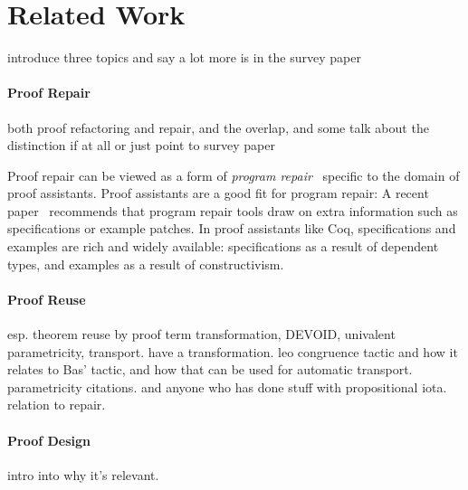 \section{Related Work}


introduce three topics and say a lot more is in the survey paper~\cite{PGL-045}

\paragraph{Proof Repair}

both proof refactoring and repair, and the overlap, and some talk about the distinction if at all or just point to survey paper~\cite{wibergh2019, WhitesidePhD, Dietrich2013, adams2015, Bourke12, Roe2016, robert2018, pumpkinpatch}

Proof repair can be viewed as a form of \textit{program repair}~\cite{Monperrus:2018:ASR:3177787.3105906, Gazzola:2018:ASR:3180155.3182526}
specific to the domain of proof assistants.
Proof assistants are a good fit for program repair: A recent paper~\cite{Qi:2015:APP:2771783.2771791} 
recommends that program repair tools draw on extra information
such as specifications or example patches. In proof assistants like Coq, specifications and examples 
are rich and widely available: specifications as a result of dependent types,
and examples as a result of constructivism.

\paragraph{Proof Reuse}

esp. theorem reuse by proof term transformation, DEVOID, univalent parametricity, transport. \cite{magaud2000changing} have a transformation.
leo congruence tactic and how it relates to Bas' tactic, and how that can be used for automatic transport.
parametricity citations. and anyone who has done stuff with propositional iota.
relation to repair.

\paragraph{Proof Design}

intro into why it's relevant.


